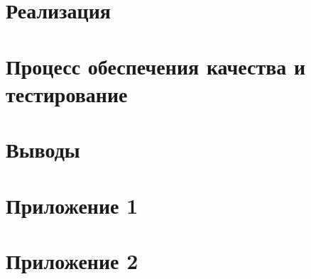 \section{Реализация}


\section{Процесс обеспечения качества и тестирование}


\section{Выводы}


\section{Приложение 1}

\section{Приложение 2}

